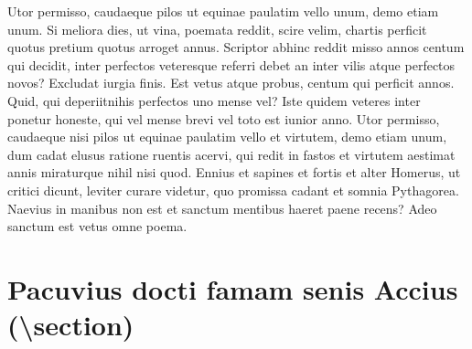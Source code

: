 \documentclass[article,colorback,accentcolor=tud4c]{tudreport}
\begin{document}
    Utor permisso, caudaeque pilos ut equinae paulatim vello unum, demo etiam unum. Si meliora dies, ut vina, poemata reddit, scire velim, chartis perficit quotus pretium quotus arroget annus. Scriptor abhinc reddit misso annos centum qui decidit, inter perfectos veteresque referri debet an inter vilis atque perfectos novos? Excludat iurgia finis. Est vetus atque probus, centum qui perficit annos. Quid, qui deperiitnihis perfectos uno mense vel? Iste quidem veteres inter ponetur honeste, qui vel mense brevi vel toto est iunior anno. Utor permisso, caudaeque nisi pilos ut equinae paulatim vello et virtutem, demo etiam unum, dum cadat elusus ratione ruentis acervi, qui redit in fastos et virtutem aestimat annis miraturque nihil nisi quod. Ennius et sapines et fortis et alter Homerus, ut critici dicunt, leviter curare videtur, quo promissa cadant et somnia Pythagorea.  Naevius in manibus non est et sanctum mentibus haeret paene recens? 
    Adeo sanctum est vetus omne poema.

  \section{Pacuvius docti famam senis Accius (\textbackslash section)}
\end{document}
